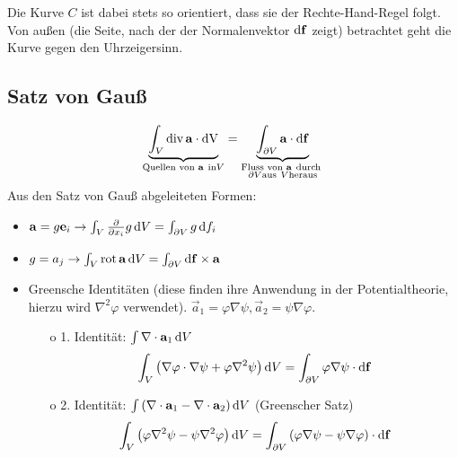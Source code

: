 Die Kurve $C$ ist dabei stets so orientiert, dass sie der Rechte-Hand-Regel folgt. Von außen (die Seite, nach der der Normalenvektor $\mathop{}\!\mathrm{d} \mathbf{f}$ zeigt) betrachtet geht die Kurve gegen den Uhrzeigersinn.


\subsection{Satz von Gauß}

\begin{equation*}
	\underset{\text{Quellen von }\mathbf{a}~\mathrm{in} V}{\underbrace{ \int _{V}\operatorname{div} \mathbf{a}\cdot \mathrm{dV}}}=\underset{\substack{
			\text{Fluss von }\mathbf{a}~\text{durch } \\
			\partial V \mathrm{aus}~V \text{heraus}
		}}{\underbrace{\int _{\partial V}\mathbf{a}\cdot \mathop{}\!\mathrm{d}\mathbf{f}}}
\end{equation*}
Aus den Satz von Gauß abgeleiteten Formen:
\begin{itemize}
	\item $\mathbf{a}=g\mathbf{e}_{i}\rightarrow \int _{V}\frac{\partial }{\partial x_{i}}g\mathop{}\!\mathrm{d} V=\int _{\partial V}g\mathop{}\!\mathrm{d} f_{i}$

	\item $g=a_{j}\rightarrow \int _{V}\operatorname{rot} \mathbf{a}\mathop{}\!\mathrm{d} V=\int _{\partial V}\mathop{}\!\mathrm{d} \mathbf{f}\times \mathbf{a}$

	\item Greensche Identitäten (diese finden ihre Anwendung in der Potentialtheorie, hierzu wird $\nabla ^{2}\varphi $ verwendet). $\vec {a}_{1}=\varphi \nabla \psi , \vec {a}_{2}=\psi \nabla \varphi $.

	      \begin{enumerate}[a]
		      \setcounter{enumii}{14}

		      \item[o] 1. Identität: $\int \nabla \cdot \mathbf{a}_{1}\mathop{}\!\mathrm{d} V$
			      \begin{equation*}
				      \int _{V}\left(\nabla \varphi \cdot \nabla \psi +\varphi \nabla ^{2}\psi \right)\mathop{}\!\mathrm{d} V=\int _{\partial V}\varphi \nabla \psi \cdot \mathop{}\!\mathrm{d} \mathbf{f}
			      \end{equation*}
		      \item[o] 2. Identität: $\int \left(\nabla \cdot \mathbf{a}_{1}-\nabla \cdot \mathbf{a}_{2}\right)\mathop{}\!\mathrm{d} V$ (Greenscher Satz)
			      \begin{equation*}
				      \int _{V}\left(\varphi \nabla ^{2}\psi -\psi \nabla ^{2}\varphi \right)\mathop{}\!\mathrm{d} V=\int _{\partial V}\left(\varphi \nabla \psi -\psi \nabla \varphi \right)\cdot \mathop{}\!\mathrm{d} \mathbf{f}
			      \end{equation*}
	      \end{enumerate}
\end{itemize}
